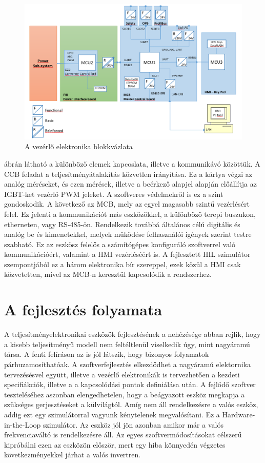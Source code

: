 
\begin{figure}[h]
	\centering
	\includegraphics[width = \textwidth]{figures/architect.png}
	\caption{A vezérlő elektronika blokkvázlata} 
	\label{fig:hw_architect}
\end{figure}

 ábrán látható a különböző elemek kapcoslata, illetve a kommunikávó közöttük. A CCB feladat a teljesítményátalakítás közvetlen irányítása. Ez a kártya végzi az analóg méréseket, és ezen mérések, illetve a beérkező alapjel alapján előállítja az IGBT-ket vezérlő PWM jeleket. A szoftveres védelmekről is ez a szint gondoskodik. A következő az MCB, mely az egyel magasabb szintű vezérlésért felel. Ez jelenti a kommunikációt más eszközökkel, a különböző terepi buszukon, etherneten, vagy RS-485-ön. Rendelkezik továbbá általános célú digitális és analóg be és kimenetekkel, melyek működése felhasználói igények szerint testre szabható. Ez az eszkösz felelős a számítógépes konfiguráló szoftverrel való kommunikációért, valamint a HMI vezérléséért is. A fejlesztett HIL szimulátor szempontjából ez a három elektronika bír szereppel, ezek közül a HMI csak közvetetten, mivel az MCB-n keresztül kapcsolódik a rendszerhez.

\section{A fejlesztés folyamata}

A teljesítményelektronikai eszközök fejlesztésének a nehézésége abban rejlik, hogy a kisebb teljesítményű modell nem feltéltlenül viselkedik úgy, mint nagyáramú társa. A fenti felíráson az is jól látszik, hogy bizonyos folyamatok párhuzamosíthatóak. A szoftverfejlesztés elkezdődhet a nagyáramú elektornika tervezésésvel együtt, illetve a vezérlő elektronikák is tervezhetően a kezdeti specifiákciók, illetve a a kapcsolódási pontok definiálása után. A fejlődő szoftver teszteléséhez aszonban elengedhetelen, hogy a beágyazott eszköz megkapja a szükséges gerjesztéseket a külvilágtól. Amíg nem áll rendelkezésre a valós eszköz, addig ezt egy szimulátorral vagyunk kénytelenek megvalósítani. Ez a Hardware-in-the-Loop szimulátor. Az eszköz jól jön azonban amikor már a valós frekvenciaváltó is rendelkezésre áll. Az egyes szoftvermódosításokat célszerű kipróbálni ezen az eszközön először, mert egy hiba könnyedén végzetes következményekkel járhat a valós invertren.

